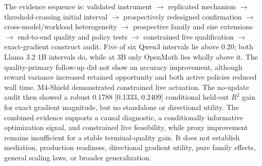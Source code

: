 \documentclass{article}
\begin{document}
The evidence sequence is: validated instrument $\rightarrow$ replicated mechanism $\rightarrow$ threshold-crossing initial interval $\rightarrow$ prospectively redesigned confirmation $\rightarrow$ cross-model/workload heterogeneity $\rightarrow$ prospective family and size extensions $\rightarrow$ end-to-end quality and policy tests $\rightarrow$ constrained live qualification $\rightarrow$ exact-gradient construct audit. Five of six Qwen3 intervals lie above 0.20; both Llama 3.2 1B intervals do, while at 3B only OpenMath lies wholly above it. The quality-primary follow-up did not show an accuracy improvement, although reward variance increased retained opportunity and both active policies reduced wall time. M4-Shield demonstrated constrained live actuation. The no-update audit then showed a robust 0.1788 [0.1333, 0.2409] conditional held-out $R^2$ gain for exact gradient magnitude, but no standalone or directional utility. The combined evidence supports a causal diagnostic, a conditionally informative optimization signal, and constrained live feasibility, while proxy improvement remains insufficient for a stable terminal-quality gain. It does not establish mediation, production readiness, directional gradient utility, pure family effects, general scaling laws, or broader generalization.



\end{document}
